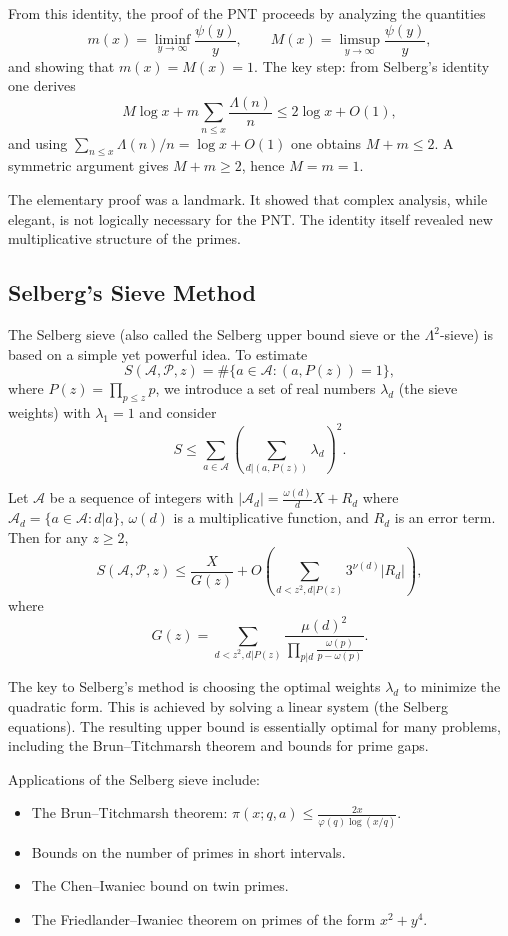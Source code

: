 From this identity, the proof of the PNT proceeds by analyzing the quantities
\[
m(x) = \liminf_{y \to \infty} \frac{\psi(y)}{y}, \qquad M(x) = \limsup_{y \to \infty} \frac{\psi(y)}{y},
\]
and showing that \(m(x) = M(x) = 1\). The key step: from Selberg's identity one derives
\[
M \log x + m \sum_{n \leq x} \frac{\Lambda(n)}{n} \leq 2 \log x + O(1),
\]
and using \(\sum_{n \leq x} \Lambda(n)/n = \log x + O(1)\) one obtains \(M + m \leq 2\). A symmetric argument gives \(M + m \geq 2\), hence \(M = m = 1\).

The elementary proof was a landmark. It showed that complex analysis, while elegant, is not logically necessary for the PNT. The identity itself revealed new multiplicative structure of the primes.

\subsection{Selberg's Sieve Method}

The Selberg sieve (also called the Selberg upper bound sieve or the \(\Lambda^2\)-sieve) is based on a simple yet powerful idea. To estimate
\[
S(\mathcal{A}, \mathcal{P}, z) = \#\{a \in \mathcal{A} : (a, P(z)) = 1\},
\]
where \(P(z) = \prod_{p \leq z} p\), we introduce a set of real numbers \(\lambda_d\) (the sieve weights) with \(\lambda_1 = 1\) and consider
\[
S \leq \sum_{a \in \mathcal{A}} \left( \sum_{d|(a, P(z))} \lambda_d \right)^2.
\]

\begin{theorem}
Let \(\mathcal{A}\) be a sequence of integers with \(|\mathcal{A}_d| = \frac{\omega(d)}{d} X + R_d\) where \(\mathcal{A}_d = \{a \in \mathcal{A} : d|a\}\), \(\omega(d)\) is a multiplicative function, and \(R_d\) is an error term. Then for any \(z \geq 2\),
\[
S(\mathcal{A}, \mathcal{P}, z) \leq \frac{X}{G(z)} + O\!\left( \sum_{d < z^2, d|P(z)} 3^{\nu(d)} |R_d| \right),
\]
where
\[
G(z) = \sum_{d < z^2, d|P(z)} \frac{\mu(d)^2}{\prod_{p|d} \frac{\omega(p)}{p - \omega(p)}}.
\]
\end{theorem}

The key to Selberg's method is choosing the optimal weights \(\lambda_d\) to minimize the quadratic form. This is achieved by solving a linear system (the Selberg equations). The resulting upper bound is essentially optimal for many problems, including the Brun--Titchmarsh theorem and bounds for prime gaps.

Applications of the Selberg sieve include:
\begin{itemize}
    \item The Brun--Titchmarsh theorem: \(\pi(x; q, a) \leq \frac{2x}{\varphi(q) \log(x/q)}\).
    \item Bounds on the number of primes in short intervals.
    \item The Chen--Iwaniec bound on twin primes.
    \item The Friedlander--Iwaniec theorem on primes of the form \(x^2 + y^4\).
\end{itemize}

